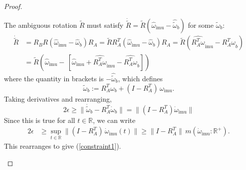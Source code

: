 \documentclass[]{article}
\def\w{\omega}
\def\hw{{\widehat\w}}
\def\ww{\tilde\w}
\def\RR{\mathbb{R}}
\def\imu{_\mathrm{imu}}
\def\m{{m}}
\begin{document}
\begin{proof}
\begin{description}
 \item
 \item[(\ref{constraint1})] The ambiguous rotation  $\tilde R$ must satisfy $\dot{\tilde R} = \tilde R(\hw\imu - \widehat{\ww}_b)$ for some $\ww_b$:
\begin{align*}
\dot{\tilde R} &= R_B R (\hw\imu  - \hw_b) R_A 
= \tilde R R_A^T(\hw\imu  - \hw_b) R_A = \tilde R (\widehat{R_A^T \w}\imu - \widehat{R_A^T \w}_{b})\\
&= \tilde R (\hw\imu  - \,[\hw\imu  + \widehat{R_A^T \w}\imu - \widehat{R_A^T \w}_{b}]) \nonumber
\end{align*}
where the quantity in brackets is $-\widehat{\ww}_b$, which defines
\begin{equation}
 \ww_{b} := R_A^T\w_b + (I - R_A^T)\,\w\imu. \label{rotdef}
\end{equation}
Taking derivatives and rearranging, 
$$
2\epsilon\geq \|\dot\ww_b-R_A^T\dot\w_b\| = \|(I-R_A^T)\dot\w\imu\|
$$
Since this is true for all $t\in\RR$, we can write
\begin{align*}
2\epsilon&\geq \sup_{t\in\RR}\|(I-R_A^T)\,\dot{\w}\imu(t)\|
\geq \|I-R_A^T\|\,\m(\dot{\w}\imu\!:\!\RR^+).
\end{align*}
This rearranges to give (\ref{constraint1}).


\end{description}
\end{proof}
\end{document}

